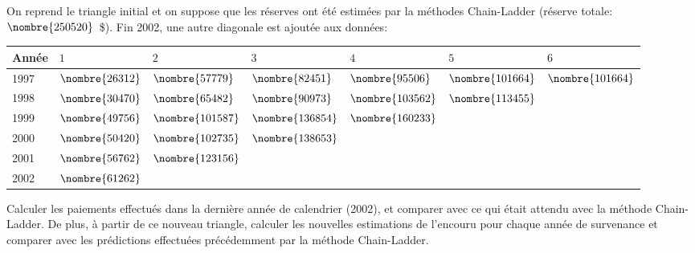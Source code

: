 \begin{exemple}
  On reprend le triangle initial et on suppose que les réserves ont
  été estimées par la méthodes Chain-Ladder (réserve totale:
  $\nombre{250520}$~\$). Fin 2002, une autre diagonale est ajoutée
  aux données:
  \begin{center}
    \begin{tabular}{|l|l l l l l l|}\hline
      Année & $1$ & $2$ & $3$ & $4$ & $5$  &$6$\\ \hline
      1997 &$\nombre{26312}$&$\nombre{57779}$&$\nombre{82451}$&$\nombre{95506}$&$\nombre{101664}$&$\nombre{101664}$ \\
      1998 &$\nombre{30470}$&$\nombre{65482}$&$\nombre{90973}$&$\nombre{103562}$&$\nombre{113455}$&\\
      1999 &$\nombre{49756}$&$\nombre{101587}$&$\nombre{136854}$&$\nombre{160233}$&&\\
      2000 &$\nombre{50420}$&$\nombre{102735}$&$\nombre{138653}$&& &\\
      2001 &$\nombre{56762}$&$\nombre{123156}$&&&&\\
      2002 &$\nombre{61262}$      &&&&& \\ \hline
    \end{tabular}
  \end{center}
  Calculer les paiements effectués dans la dernière année de
  calendrier (2002), et comparer avec ce qui était attendu avec la
  méthode Chain-Ladder. De plus, à partir de ce nouveau triangle,
  calculer les nouvelles estimations de l'encouru pour chaque année de
  survenance et comparer avec les prédictions effectuées précédemment
  par la méthode Chain-Ladder.


\end{exemple}
